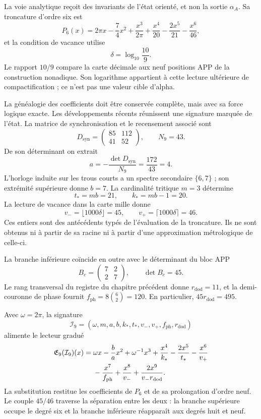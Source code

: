 La voie analytique reçoit des invariants de l'état orienté, et non la sortie
\(\alpha_A\). Sa troncature d'ordre six est
\begin{equation}
 P_6(x)=2\pi x-\frac74x^2
 +\frac{x^3}{2\pi}
 +\frac{x^4}{20}-\frac{2x^5}{21}-\frac{x^6}{46},
 \label{x_reciprocidad:eq:alpha-p6}
\end{equation}
et la condition de vacance utilise
\[
 \delta=\log_{10}\frac{10}{9}.
\]
Le rapport \(10/9\) compare la carte décimale aux neuf positions APP de la construction nonadique. Son logarithme appartient à cette lecture ultérieure de compactification ; ce n'est pas une valeur cible d'alpha.

La généalogie des coefficients doit être conservée complète, mais avec sa
force logique exacte. Les développements récents réunissent une signature marquée
de l'état. La matrice de synchronisation et le recensement associé sont
\[
 D_{\mathrm{syn}}=\begin{pmatrix}85&112\\41&52\end{pmatrix},
 \qquad N_9=43.
\]
De son déterminant on extrait
\[
 a=-\frac{\det D_{\mathrm{syn}}}{N_9}
   =\frac{172}{43}=4.
\]
L'horloge induite sur les trous courts a un spectre secondaire \(\{6,7\}\) ; son extrémité supérieure donne \(b=7\). La cardinalité tritique \(m=3\) détermine
\[
 t_*=mb=21,\qquad k_*=mb-1=20.
\]
La lecture de vacance dans la carte mille donne
\[
 v_-=\lfloor1000\delta\rfloor=45,\qquad
 v_+=\lceil1000\delta\rceil=46.
\]
Ces entiers sont des antécédents typés de l'évaluation de la troncature. Ils ne sont obtenus ni à partir de sa racine ni à partir d'une approximation métrologique de celle-ci.

La branche inférieure coïncide en outre avec le déterminant du bloc APP
\[
 B_c=\begin{pmatrix}7&2\\2&7\end{pmatrix},\qquad\det B_c=45.
\]
Le rang transversal du registre du chapitre précédent donne
\(r_{\mathrm{dod}}=11\), et la demi-couronne de phase fournit
\(f_{\mathrm{ph}}=8\binom62=120\). En particulier,
\(45r_{\mathrm{dod}}=495\).

Avec \(\omega=2\pi\), la signature
\[
 \mathcal I_9=(\omega,m,a,b,k_*,t_*,v_-,v_+,f_{\mathrm{ph}},r_{\mathrm{dod}})
\]
alimente le lecteur gradué
\begin{align}
 \mathfrak E_9(\mathcal I_9)(x)
 ={}&\omega x-\frac ba x^2+\omega^{-1}x^3
 +\frac{x^4}{k_*}-\frac{2x^5}{t_*}-\frac{x^6}{v_+}\notag\\
 &-\frac{x^7}{f_{\mathrm{ph}}}+\frac{x^8}{v_-}
 +\frac{2x^9}{v_-r_{\mathrm{dod}}}.
 \label{x_reciprocidad:eq:alpha-firma-coeficientes}
\end{align}
La substitution restitue les coefficients de \(P_6\) et de sa
prolongation d'ordre neuf. Le couple \(45/46\) traverse la séparation
entre les deux : la branche supérieure occupe le degré six et la branche inférieure réapparaît
aux degrés huit et neuf.

